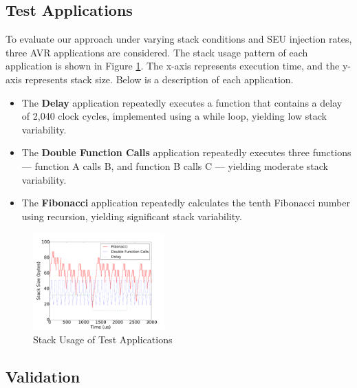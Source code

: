 \subsection{Test Applications}
\vspace{-5pt}
To evaluate our approach under varying stack conditions and SEU injection rates, three AVR applications are considered. The stack usage pattern of each application is shown in Figure \ref{fig:stacksize_usage}. The x-axis represents execution time, and the y-axis represents stack size. Below is a description of each application.

\begin{itemize}
\item The \textbf{Delay} application repeatedly executes a function that contains a delay of 2,040 clock cycles, implemented using a while loop, yielding low stack variability.
\vspace{-10pt}
\item The \textbf{Double Function Calls} application repeatedly executes three functions --- function A calls B, and function B calls C --- yielding moderate stack variability.
\vspace{-10pt}
\item The \textbf{Fibonacci} application repeatedly calculates the tenth Fibonacci number using recursion, yielding significant stack variability.
\vspace{-10pt}
\end{itemize}

\begin{figure}[h]
\centering
\includegraphics[width=0.45\textwidth]{figures/stacksize_usage_v3.pdf}
\caption{Stack Usage of Test Applications}
\vspace{-15pt}
\label{fig:stacksize_usage}
\end{figure}

\vspace{-10pt}
\subsection{Validation}
\vspace{-5pt}

